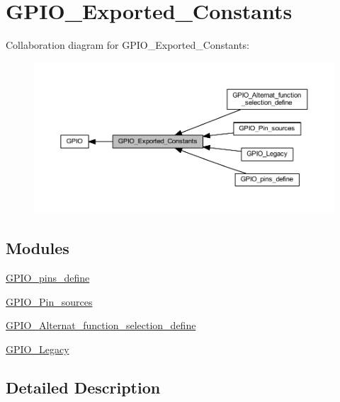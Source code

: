 \hypertarget{group___g_p_i_o___exported___constants}{}\section{G\+P\+I\+O\+\_\+\+Exported\+\_\+\+Constants}
\label{group___g_p_i_o___exported___constants}
Collaboration diagram for G\+P\+I\+O\+\_\+\+Exported\+\_\+\+Constants\+:
\nopagebreak
\begin{figure}[H]
\begin{center}
\leavevmode
\includegraphics[width=350pt]{group___g_p_i_o___exported___constants}
\end{center}
\end{figure}
\subsection*{Modules}
\begin{DoxyCompactItemize}
\item 
\hyperlink{group___g_p_i_o__pins__define}{G\+P\+I\+O\+\_\+pins\+\_\+define}
\item 
\hyperlink{group___g_p_i_o___pin__sources}{G\+P\+I\+O\+\_\+\+Pin\+\_\+sources}
\item 
\hyperlink{group___g_p_i_o___alternat__function__selection__define}{G\+P\+I\+O\+\_\+\+Alternat\+\_\+function\+\_\+selection\+\_\+define}
\item 
\hyperlink{group___g_p_i_o___legacy}{G\+P\+I\+O\+\_\+\+Legacy}
\end{DoxyCompactItemize}


\subsection{Detailed Description}

